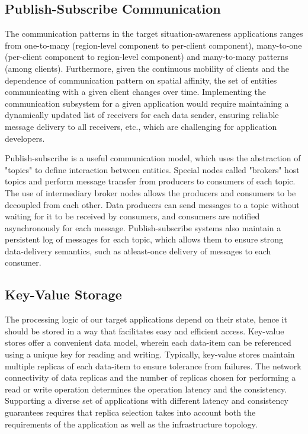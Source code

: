 \subsection{Publish-Subscribe Communication}
The communication patterns in the target situation-awareness applications ranges from one-to-many (region-level component to per-client component), many-to-one (per-client component to region-level component) and many-to-many patterns (among clients). Furthermore, given the continuous mobility of clients and the dependence of communication pattern on spatial affinity, the set of entities communicating with a given client changes over time. Implementing the communication subsystem for a given application would require maintaining a dynamically updated list of receivers for each data sender, ensuring reliable message delivery to all receivers, etc., which are challenging for application developers.
\par Publish-subscribe is a useful communication model, which uses the abstraction of "topics" to define interaction between entities. Special nodes called "brokers" host topics and perform message transfer from producers to consumers of each topic. The use of intermediary broker nodes allows the producers and consumers to be decoupled from each other. Data producers can send messages to a topic without waiting for it to be received by consumers, and consumers are notified asynchronously for each message. Publish-subscribe systems also maintain a persistent log of messages for each topic, which allows them to ensure strong data-delivery semantics, such as atleast-once delivery of messages to each consumer.

\subsection{Key-Value Storage}
The processing logic of our target applications depend on their state, hence it should be stored in a way that facilitates easy and efficient access. Key-value stores offer a convenient data model, wherein each data-item can be referenced using a unique key for reading and writing. Typically, key-value stores maintain multiple replicas of each data-item to ensure tolerance from failures. The network connectivity of data replicas and the number of replicas chosen for performing a read or write operation determines the operation latency and the consistency. Supporting a diverse set of applications with different latency and consistency guarantees requires that replica selection takes into account both the requirements of the application as well as the infrastructure topology.

